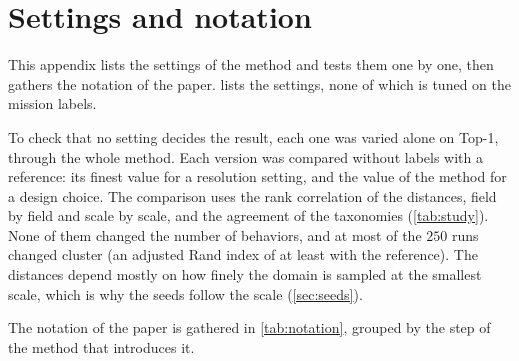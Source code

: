 \section{Settings and notation}
\label{app:settings}

This appendix lists the settings of the method and tests them one by one, then gathers the notation of the paper.
 lists the settings, none of which is tuned on the mission labels.

\begin{table}[!htbp]
\centering
\caption{Fixed settings of the method. A \emph{resolution} setting can be refined without changing
what is computed, only how finely; a \emph{design} setting defines what is computed.}
\label{tab:settings}
\end{table}

To check that no setting decides the result, each one was varied alone on Top-1, through the whole method. Each
version was compared without labels with a reference: its finest value for a resolution setting, and the value of
the method for a design choice. The
comparison uses the rank correlation of the distances, field by field and scale by scale, and the agreement
of the taxonomies (\cref{tab:study}). None of them changed the number of behaviors, and at most
 of the $250$ runs changed cluster (an adjusted Rand index of at least
 with the reference). The distances depend mostly on how finely the domain is sampled at
the smallest scale, which is why the seeds follow the scale (\cref{sec:seeds}).

\begin{table}[!htbp]
\centering
\caption{Each setting varied alone on Top-1, without labels. \emph{Distances}: the Spearman rank correlation
between the distances at the value of the method and at the finest value tested, the smallest over
the twenty matrices of fields and scales. For a design choice, it is the smallest over the values tested.
\emph{Taxonomy}: the smallest adjusted Rand index between the consensus partition of a value tested and
that of the reference. Resolution settings are checked on the domain of the method (seeds within
$\sigma/2$ of every robot position) when it was run, otherwise on a fixed subset of $\nm{n-coreset}$ robot positions.}
\label{tab:study}
\end{table}

The notation of the paper is gathered in \cref{tab:notation}, grouped by the step of the method that introduces it.

